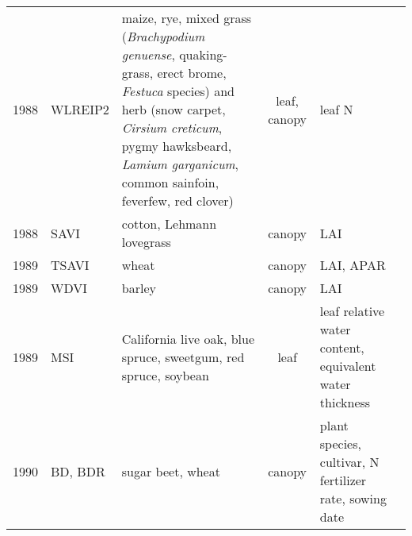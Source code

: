 \documentclass[10pt]{article}
\begin{document}
{\begin{ThreePartTable}
\begin{longtable}{c M{1.5in} M{2.5in} c M{1.5in} M{1.5in}}
  1988 & WLREIP2                                         & maize, rye, mixed grass (\textit{Brachypodium genuense}, quaking-grass, erect brome, \textit{Festuca} species) and herb (snow carpet, \textit{Cirsium creticum}, pygmy hawksbeard, \textit{Lamium garganicum}, common sainfoin, feverfew, red clover) & leaf, canopy & leaf N                                                                                   & \citet{Guyot1988,Cho2006}                           \\
  1988 & SAVI                                            & cotton, Lehmann lovegrass                                                                                                                                                                                                                             & canopy       & LAI                                                                                      & \citet{Huete1988}                                   \\
  1989 & TSAVI                                           & wheat                                                                                                                                                                                                                                                 & canopy       & LAI, APAR                                                                                & \citet{Baret1989}                                   \\
  1989 & WDVI                                            & barley                                                                                                                                                                                                                                                & canopy       & LAI                                                                                      & \citet{Clevers1989}                                 \\
  1989 & MSI                                             & California live oak, blue spruce, sweetgum, red spruce, soybean                                                                                                                                                                                       & leaf         & leaf relative water content, equivalent water thickness                                  & \citet{Hunt1989}                                    \\
  1990 & BD, BDR                                         & sugar beet, wheat                                                                                                                                                                                                                                     & canopy       & plant species, cultivar, N fertilizer rate, sowing date                                  & \citet{Boochs1990}                                  \\

\end{longtable}
\end{ThreePartTable}}
\end{document}

